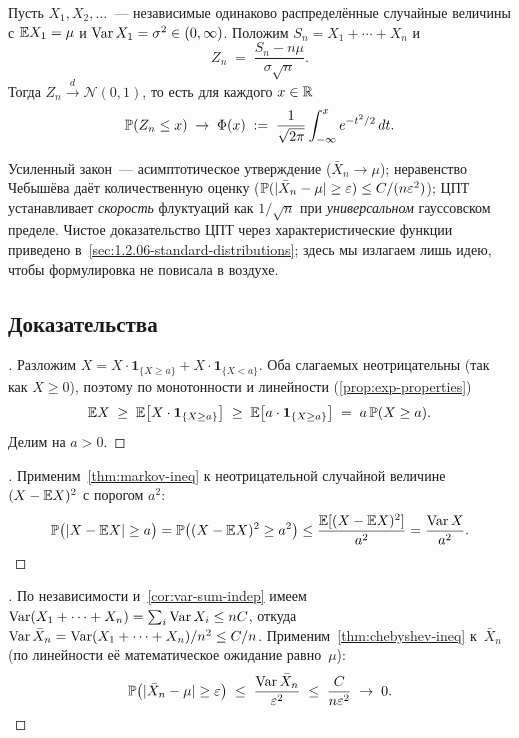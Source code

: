 \begin{theorem}
\label{thm:clt}
Пусть $X_1, X_2, \dots$~--- независимые одинаково распределённые случайные величины с $\mathbb{E} X_1 = \mu$ и $\operatorname{Var} X_1 = \sigma^2 \in (0, \infty)$. Положим $S_n = X_1 + \cdots + X_n$ и
\[
  Z_n \;=\; \frac{S_n - n\mu}{\sigma \sqrt{n}}.
\]
Тогда $Z_n \xrightarrow{d} \mathcal{N}(0, 1)$, то есть для каждого $x \in \mathbb{R}$
\[
  \mathbb{P}(Z_n \leq x) \;\to\; \Phi(x) \;:=\; \frac{1}{\sqrt{2\pi}} \int_{-\infty}^{x} e^{-t^2/2}\, dt.
\]
\end{theorem}

\begin{remark}
Усиленный закон~--- асимптотическое утверждение ($\bar X_n \to \mu$); неравенство Чебышёва даёт количественную оценку ($\mathbb{P}(|\bar X_n - \mu| \geq \varepsilon) \leq C/(n\varepsilon^2)$); ЦПТ устанавливает \emph{скорость} флуктуаций как $1/\sqrt{n}$ при \emph{универсальном} гауссовском пределе. Чистое доказательство ЦПТ через характеристические функции приведено в~\cref{sec:1.2.06-standard-distributions}; здесь мы излагаем лишь идею, чтобы формулировка не повисала в воздухе.
\end{remark}

\subsection*{Доказательства}

\begin{proof}[]
Разложим $X = X \cdot \mathbf{1}_{\{X \geq a\}} + X \cdot \mathbf{1}_{\{X < a\}}$. Оба слагаемых неотрицательны (так как $X \geq 0$), поэтому по монотонности и линейности (\cref{prop:exp-properties})
\[
  \mathbb{E} X \;\geq\; \mathbb{E}\bigl[X \cdot \mathbf{1}_{\{X \geq a\}}\bigr] \;\geq\; \mathbb{E}\bigl[a \cdot \mathbf{1}_{\{X \geq a\}}\bigr] \;=\; a\, \mathbb{P}(X \geq a).
\]
Делим на $a > 0$.
\end{proof}

\begin{proof}[]
Применим~\cref{thm:markov-ineq} к неотрицательной случайной величине $(X - \mathbb{E} X)^2$ с порогом $a^2$:
\[
  \mathbb{P}\bigl(|X - \mathbb{E} X| \geq a\bigr) = \mathbb{P}\bigl((X - \mathbb{E} X)^2 \geq a^2\bigr) \leq \frac{\mathbb{E}[(X - \mathbb{E} X)^2]}{a^2} = \frac{\operatorname{Var} X}{a^2}. \qedhere
\]
\end{proof}

\begin{proof}[]
По независимости и~\cref{cor:var-sum-indep} имеем $\operatorname{Var}(X_1 + \cdots + X_n) = \sum_i \operatorname{Var} X_i \leq nC$, откуда $\operatorname{Var} \bar X_n = \operatorname{Var}(X_1 + \cdots + X_n)/n^2 \leq C/n$. Применим~\cref{thm:chebyshev-ineq} к~$\bar X_n$ (по линейности её математическое ожидание равно~$\mu$):
\[
  \mathbb{P}\bigl(|\bar X_n - \mu| \geq \varepsilon\bigr) \;\leq\; \frac{\operatorname{Var} \bar X_n}{\varepsilon^2} \;\leq\; \frac{C}{n \varepsilon^2} \;\to\; 0.
\]
\end{proof}


